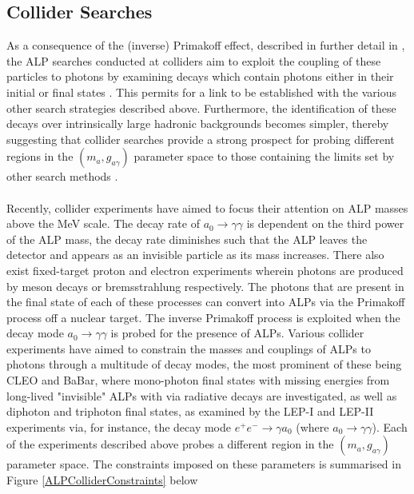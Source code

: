 \subsection{Collider Searches}   
As a consequence of the (inverse) Primakoff effect, described in further detail in \cite{Primakoff:1951iae}, the ALP searches conducted at colliders aim to exploit the coupling of these particles to photons by examining decays which contain photons either
in their initial or final states \cite{d'Enterria:2753504}. This permits for a link to be established with the various other search strategies described above. Furthermore, the identification of these decays over intrinsically large hadronic backgrounds becomes
simpler, thereby suggesting that collider searches provide a strong prospect for probing different regions in the $(m_{a}, g_{a\gamma})$ parameter space to those containing the limits set by other search methods \cite{d'Enterria:2753504}.\\
\\
Recently, collider experiments have aimed to focus their attention on ALP masses above the MeV scale. The decay rate of $a_{0}\rightarrow\gamma\gamma$ is dependent on the third power of the ALP mass, the decay rate 
diminishes such that the ALP leaves the detector and appears as an invisible particle as its mass increases. There also exist fixed-target proton and electron experiments wherein photons are produced by meson decays or bremsstrahlung
respectively. The photons that are present in the final state of each of these processes can convert into ALPs via the Primakoff process off a nuclear target. The inverse Primakoff process is exploited when the decay mode $a_{0}\rightarrow\gamma\gamma$ is probed for the presence of ALPs. Various collider experiments have
aimed to constrain the masses and couplings of ALPs to photons through a multitude of decay modes, the most prominent of these being CLEO and BaBar, where mono-photon final states with missing energies from long-lived "invisible" ALPs with via radiative decays are investigated, as well as diphoton and triphoton final states, as 
examined by the LEP-I and LEP-II experiments via, for instance, the decay mode $e^{+}e^{-}\rightarrow\gamma a_{0}$ (where $a_{0}\rightarrow\gamma\gamma$). Each of the experiments described above probes a different region in the $(m_a, g_{a\gamma})$ parameter space. The constraints imposed on these parameters is summarised in Figure
\ref{ALPColliderConstraints} below
